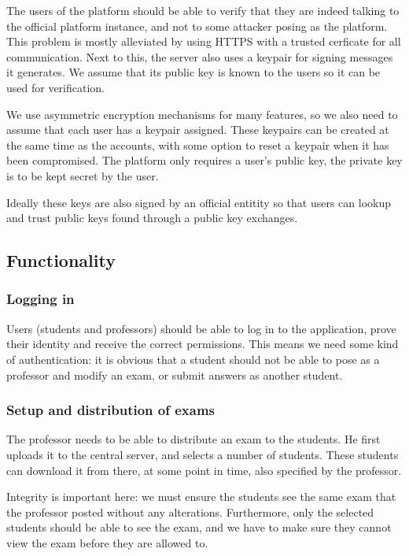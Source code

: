 \documentclass[12pt]{article}
\begin{document}
The users of the platform should be able to verify that they are indeed talking
to the official platform instance, and not to some attacker posing as the
platform. This problem is mostly alleviated by using HTTPS with a trusted
cerficate for all communication. Next to this, the server also uses a keypair
for signing messages it generates. We assume that its public key is known to the
users so it can be used for verification.

We use asymmetric encryption mechanisms for many features, so we also need to
assume that each user has a keypair assigned. These keypairs can be created at
the same time as the accounts, with some option to reset a keypair when it has
been compromised. The platform only requires a user's public key, the private
key is to be kept secret by the user.

Ideally these keys are also signed by an official entitity so that users can
lookup and trust public keys found through a public key exchanges.

\subsection{Functionality}
\label{subsec:req-functionality}

\subsubsection{Logging in}
\label{subsubsec:req-func-auth}

Users (students and professors) should be able to log in to the application,
prove their identity and receive the correct permissions. This means we need
some kind of authentication: it is obvious that a student should not be able to
pose as a professor and modify an exam, or submit answers as another student.

\subsubsection{Setup and distribution of exams}
\label{subsubsec:req-func-exams}

The professor needs to be able to distribute an exam to the students. He first
uploads it to the central server, and selects a number of students. These
students can download it from there, at some point in time, also specified by
the professor.

Integrity is important here: we must ensure the students see the same exam that
the professor posted without any alterations. Furthermore, only the selected
students should be able to see the exam, and we have to make sure they cannot
view the exam before they are allowed to.
\end{document}
